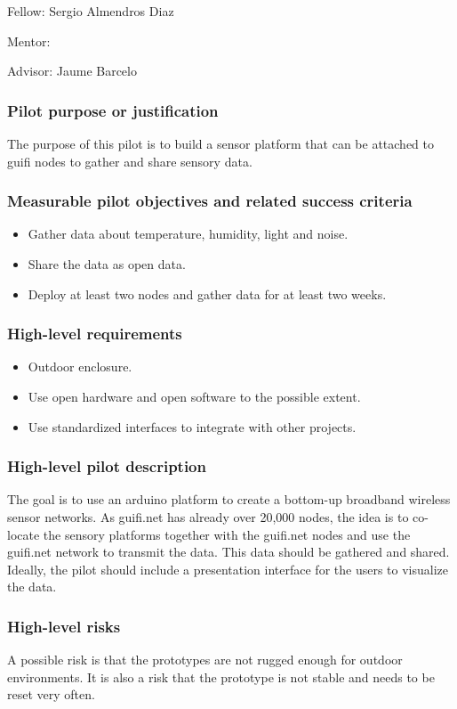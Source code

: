 \documentclass[draftclsnofoot,12pt,journal,onecolumn]{IEEEtran}
\begin{document}
Fellow: Sergio Almendros Diaz

Mentor: 

Advisor: Jaume Barcelo

\subsubsection{Pilot purpose or justification}
The purpose of this pilot is to build a sensor platform that can be attached to guifi nodes to gather and share sensory data.

\subsubsection{Measurable pilot objectives and related success criteria}
\begin{itemize}
\item Gather data about temperature, humidity, light and noise. 
\item Share the data as open data.
\item Deploy at least two nodes and gather data for at least two weeks.
\end{itemize}

\subsubsection{High-level requirements}
\begin{itemize}
\item Outdoor enclosure.
\item Use open hardware and open software to the possible extent.
\item Use standardized interfaces to integrate with other projects.
\end{itemize}

\subsubsection{High-level pilot description}
The goal is to use an arduino platform to create a bottom-up broadband wireless sensor networks. 
As guifi.net has already over 20,000 nodes, the idea is to co-locate the sensory platforms together with the guifi.net nodes and use the guifi.net network to transmit the data.
This data should be gathered and shared.
Ideally, the pilot should include a presentation interface for the users to visualize the data.

\subsubsection{High-level risks}
A possible risk is that the prototypes are not rugged enough for outdoor environments.
It is also a risk that the prototype is not stable and needs to be reset very often.
\end{document}
